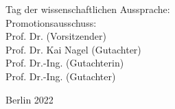 \begin{flushright}
	\hrulefill

 	Tag der wissenschaftlichen Aussprache:  \\

	\vspace{5mm}
	Promotionsausschuss:\\
	Prof. Dr. (Vorsitzender)\\
    	Prof. Dr. Kai Nagel (Gutachter)\\
    	Prof. Dr.-Ing.  (Gutachterin)\\
     	Prof. Dr.-Ing. (Gutachter)\\
	\vspace{10mm}

	Berlin 2022\\

\end{flushright}
